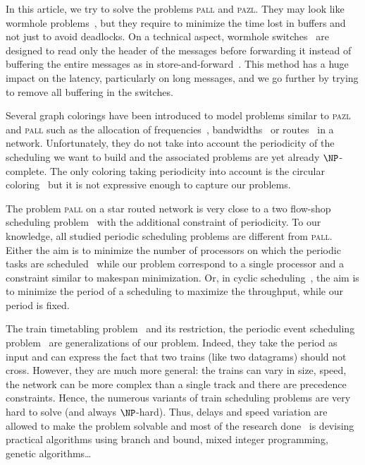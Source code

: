 \documentclass[a4paper,10pt]{journal}
\newcommand\pazl{\textsc{pazl}\xspace}
\newcommand\pall{\textsc{pall}\xspace}
\begin{document}
In this article, we try to solve the problems \pall and \pazl. They may look like wormhole problems~\cite{ni1993survey,cole1996benefit}, but they require to minimize the time lost in buffers and not just to avoid deadlocks. On a technical aspect, wormhole switches~\cite{cole1996benefit} are designed to read only the header of the messages before forwarding it instead of buffering the entire messages as in store-and-forward~\cite{tindell1992store}. This method has a huge impact on the latency, particularly on long messages, and we go further by trying to remove all buffering in the switches.

 Several graph colorings have been introduced to model problems similar to \pazl and \pall such as the allocation of frequencies~\cite{borndorfer1998frequency}, bandwidths~\cite{erlebach2001complexity} or routes~\cite{cole1996benefit} in a network. Unfortunately, they do not take into account the periodicity of the scheduling we want to build and the associated problems are yet already $\NP$-complete. The only coloring taking periodicity into account is the circular coloring~\cite{ZHU2001371,zhou2013multiple} but it is not expressive enough to capture our problems. 

The problem \pall on a star routed network is very close to a two flow-shop scheduling problem~\cite{yu2004minimizing} with the additional constraint of periodicity. To our knowledge, all studied periodic scheduling problems are different from \pall. Either the aim is to minimize the number of processors on which the periodic tasks are scheduled~\cite{korst1991periodic,hanen1993cyclic} while our problem correspond to a single processor and a constraint similar to makespan minimization. Or, in cyclic scheduling~\cite{levner2010complexity}, the aim is to minimize the period of a scheduling to maximize the throughput, while our period is fixed. 

The train timetabling problem~\cite{lusby2011railway} and its restriction, the periodic event scheduling problem~\cite{serafini1989mathematical} are generalizations of our problem. Indeed, they take the period as input and can express the fact that two trains (like two datagrams) should not cross. However, they are much more general: the trains can vary in size, speed, the network can be more complex than a single track and there are precedence constraints. Hence, the numerous variants of train scheduling problems are very hard to solve (and always $\NP$-hard). Thus, delays and speed variation are allowed to make the problem solvable and most of the research done~\cite{lusby2011railway} is devising practical algorithms using branch and bound, mixed integer programming, genetic algorithms\dots
\end{document}
